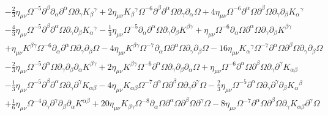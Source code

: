 \documentclass[aps]{revtex4}
\begin{document}
\begin{align}
 \nonumber\\
 &-  \tfrac{2}{3} \eta_{\mu \nu} \Omega^{-5} \partial^{\beta}\partial_{\alpha}\partial^{\alpha}\Omega \partial_{\gamma}K_{\beta}{}^{\gamma} + 2 \eta_{\mu \nu} K_{\beta}{}^{\gamma} \Omega^{-6} \partial^{\beta}\partial^{\alpha}\Omega \partial_{\gamma}\partial_{\alpha}\Omega + 4 \eta_{\mu \nu} \Omega^{-6} \partial^{\alpha}\Omega \partial^{\beta}\Omega \partial_{\gamma}\partial_{\beta}K_{\alpha}{}^{\gamma} 
 \nonumber\\
 &-  \tfrac{4}{3} \eta_{\mu \nu} \Omega^{-5} \partial^{\beta}\partial^{\alpha}\Omega \partial_{\gamma}\partial_{\beta}K_{\alpha}{}^{\gamma} -  \tfrac{1}{3} \eta_{\mu \nu} \Omega^{-5} \partial_{\alpha}\partial^{\alpha}\Omega \partial_{\gamma}\partial_{\beta}K^{\beta \gamma} + \eta_{\mu \nu} \Omega^{-6} \partial_{\alpha}\Omega \partial^{\alpha}\Omega \partial_{\gamma}\partial_{\beta}K^{\beta \gamma}
 \nonumber\\
 & + \eta_{\mu \nu} K^{\beta \gamma} \Omega^{-6} \partial_{\alpha}\partial^{\alpha}\Omega \partial_{\gamma}\partial_{\beta}\Omega - 4 \eta_{\mu \nu} K^{\beta \gamma} \Omega^{-7} \partial_{\alpha}\Omega \partial^{\alpha}\Omega \partial_{\gamma}\partial_{\beta}\Omega - 16 \eta_{\mu \nu} K_{\alpha}{}^{\gamma} \Omega^{-7} \partial^{\alpha}\Omega \partial^{\beta}\Omega \partial_{\gamma}\partial_{\beta}\Omega 
 \nonumber\\
 &-  \tfrac{2}{3} \eta_{\mu \nu} \Omega^{-5} \partial^{\alpha}\Omega \partial_{\gamma}\partial_{\beta}\partial_{\alpha}K^{\beta \gamma} + 2 \eta_{\mu \nu} K^{\beta \gamma} \Omega^{-6} \partial^{\alpha}\Omega \partial_{\gamma}\partial_{\beta}\partial_{\alpha}\Omega + \eta_{\mu \nu} \Omega^{-6} \partial^{\alpha}\Omega \partial^{\beta}\Omega \partial_{\gamma}\partial^{\gamma}K_{\alpha \beta}
 \nonumber\\
 & -  \tfrac{1}{3} \eta_{\mu \nu} \Omega^{-5} \partial^{\beta}\partial^{\alpha}\Omega \partial_{\gamma}\partial^{\gamma}K_{\alpha \beta} - 4 \eta_{\mu \nu} K_{\alpha \beta} \Omega^{-7} \partial^{\alpha}\Omega \partial^{\beta}\Omega \partial_{\gamma}\partial^{\gamma}\Omega -  \tfrac{2}{3} \eta_{\mu \nu} \Omega^{-5} \partial^{\alpha}\Omega \partial_{\gamma}\partial^{\gamma}\partial_{\beta}K_{\alpha}{}^{\beta}
\nonumber \\
 & + \tfrac{1}{6} \eta_{\mu \nu} \Omega^{-4} \partial_{\gamma}\partial^{\gamma}\partial_{\beta}\partial_{\alpha}K^{\alpha \beta} + 20 \eta_{\mu \nu} K_{\beta \gamma} \Omega^{-8} \partial_{\alpha}\Omega \partial^{\alpha}\Omega \partial^{\beta}\Omega \partial^{\gamma}\Omega - 8 \eta_{\mu \nu} \Omega^{-7} \partial^{\alpha}\Omega \partial^{\beta}\Omega \partial_{\gamma}K_{\alpha \beta} \partial^{\gamma}\Omega

\end{align}
\end{document}
